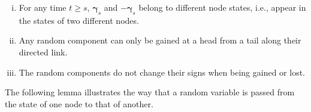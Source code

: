 \documentclass[a4paper, 11pt]{article}
\newcommand{\1}{\mathbf{1}}
\newcommand{\gammab}{{\bm \gamma}}
\begin{document}
\begin{enumerate}[(i)]
	\item For any time $t\ge s$, $\gammab_s$ and $-\gammab_s$ belong to different node states, {i.e., appear in the states of two different nodes.}
	\item Any random component can only be gained at a head from a tail along their directed link.
	\item The random components do not change their signs when being gained or lost.
\end{enumerate}
The following lemma illustrates the way that a random variable is passed from the state of one node to that of another.
\end{document}
